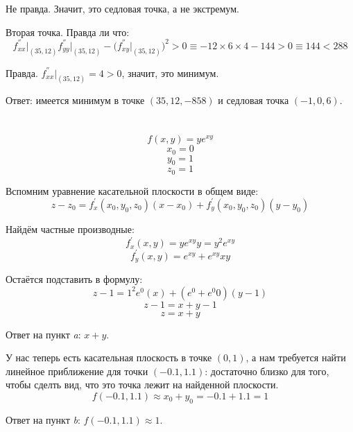 \documentclass[a4paper,10pt]{article}
\begin{document}
Не правда. Значит, это седловая точка, а не экстремум.

Вторая точка. Правда ли что:
$$
f^{''}_{xx}\big|_{(35, 12)}
f^{''}_{yy}\big|_{(35, 12)}
- \big(f^{''}_{xy}\big|_{(35, 12)}\big)^2
> 0
\equiv
- 12 \times 6 \times 4 - 144 > 0
\equiv
144 < 288
$$

Правда. $ f^{''}_{xx}\big|_{(35, 12)} = 4 > 0 $, значит, это минимум.

Ответ: имеется минимум в точке $(35, 12, -858)$ и седловая точка $(-1, 0, 6)$.

\section{}

$$ f(x, y) = ye^{xy} $$
$$ x_0 = 0 $$
$$ y_0 = 1 $$
$$ z_0 = 1 $$

Вспомним уравнение касательной плоскости в общем виде:
$$ z - z_0 = f^{'}_x(x_0, y_0, z_0)(x - x_0)
+ f^{'}_y(x_0, y_0, z_0)(y - y_0) $$

Найдём частные производные:
$$ f^{'}_x(x, y) = ye^{xy}y = y^2e^{xy} $$
$$ f^{'}_y(x, y) = e^{xy} + e^{xy}xy $$

Остаётся подставить в формулу:
$$ z - 1 = 1^2e^{0}(x) + (e^{0} + e^{0}0)(y - 1) $$
$$ z - 1 = x + y - 1 $$
$$ z = x + y $$

Ответ на пункт \textit{a}: $x + y$.

У нас теперь есть касательная плоскость в точке $(0, 1)$, а нам требуется найти линейное приближение для точки $(-0.1, 1.1)$: достаточно близко для того, чтобы сделть вид, что это точка лежит на найденной плоскости.
$$ f(-0.1, 1.1) \approx x_0 + y_0 = -0.1 + 1.1 = 1 $$

Ответ на пункт \textit{b}: $ f(-0.1, 1.1) \approx 1 $.
\end{document}
